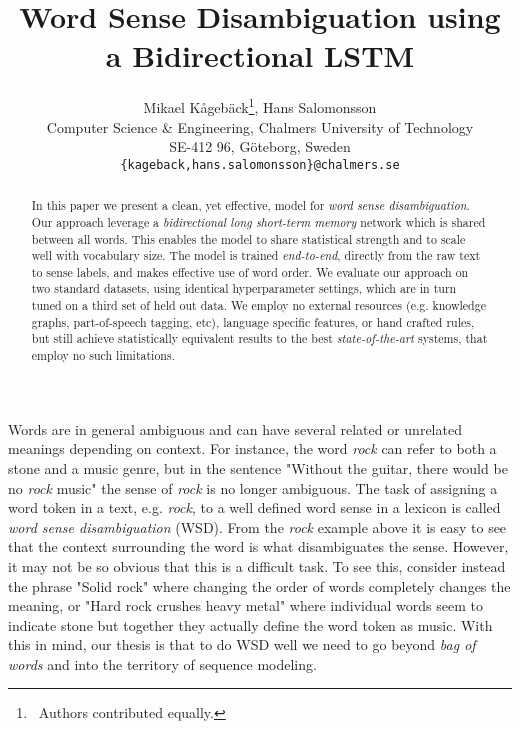 \documentclass[11pt]{article}
\title{Word Sense Disambiguation using a Bidirectional LSTM}
\author{Mikael K{\aa}geb{\"a}ck\thanks{~Authors contributed equally.}, Hans Salomonsson\samethanks[1]\\
Computer Science \& Engineering, Chalmers University of Technology \\
SE-412 96, G\"{o}teborg, Sweden\\
  {\tt \{kageback,hans.salomonsson\}@chalmers.se} }
\date{}
\begin{document}
\maketitle
\begin{abstract}
In this paper we present a clean, yet effective, model for \emph{word sense disambiguation}. 
Our approach leverage a \emph{bidirectional long short-term memory} network which is shared between all words. This enables the model to share statistical strength and to scale well with vocabulary size.
The model is trained \emph{end-to-end}, directly from the raw text to sense labels, and makes effective use of word order. 
We evaluate our approach on two standard datasets, using identical hyperparameter settings, which are in turn tuned on a third set of held out data. 
We employ no external resources (e.g. knowledge graphs, part-of-speech tagging, etc), language specific features, or hand crafted rules, but still achieve statistically equivalent results to the best \emph{state-of-the-art} systems, that employ no such limitations.  

\end{abstract}
Words are in general ambiguous and can have several related or unrelated meanings depending on context. For instance, the word \emph{rock} can refer to both a stone and a music genre, but in the sentence "Without the guitar, there would be no \emph{rock} music" the sense of \emph{rock} is no longer ambiguous. The task of assigning a word token in a text, e.g. \emph{rock}, to a well defined word sense in a lexicon is called \emph{word sense disambiguation} (WSD). 
From the \emph{rock} example above it is easy to see that the context surrounding the word is what disambiguates the sense. However, it may not be so obvious that this is a difficult task. To see this, consider instead the phrase "Solid rock" where changing the order of words completely changes the meaning, or "Hard rock crushes heavy metal" where individual words seem to indicate stone but together they actually define the word token as music. With this in mind, our thesis is that to do WSD well we need to go beyond \emph{bag of words} and into the territory of sequence modeling. 
\end{document}
